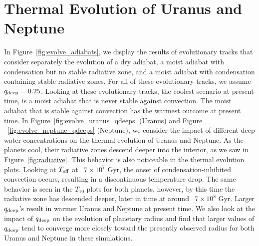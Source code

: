 \documentclass[11pt]{ucscthesisbs}
\begin{document}
\section{Thermal Evolution of Uranus and Neptune}

In Figure~\ref{fig:evolve_adiabats}, we display the results of evolutionary tracks that consider separately the evolution of a dry adiabat, a moist adiabat with condensation but no stable radiative zone, and a moist adiabat with condensation containing stable radiative zones. For all of these evolutionary tracks, we assume $q_{\rm deep} = 0.25$. Looking at these evolutionary tracks, the coolest scenario at present time, is a moist adiabat that is never stable against convection. The moist adiabat that is stable against convection has the warmest outcome at present time. In Figure~\ref{fig:evolve_uranus_qdeeps} (Uranus) and Figure ~\ref{fig:evolve_neptune_qdeeps} (Neptune), we consider the impact of different deep water concentrations on the thermal evolution of Uranus and Neptune. As the planets cool, their radiative zones descend deeper into the interior, as we saw in Figure~\ref{fig:radiative}. This behavior is also noticeable in the thermal evolution plots. Looking at $T_{\rm eff}$ at ~$7 \times 10^7$ Gyr, the onset of condensation-inhibited convection occurs, resulting in a discontinuous temperature drop. The same behavior is seen in the $T_{10}$ plots for both planets, however, by this time the radiative zone has descended deeper, later in time at around ~$7 \times 10^8$ Gyr. Larger $q_{\rm deep}$'s result in warmer Uranus and Neptune at present time. We also look at the impact of $q_{\rm deep}$ on the evolution of planetary radius and find that larger values of $q_{\rm deep}$ tend to converge more closely toward the presently observed radius for both Uranus and Neptune in these simulations. 
\end{document}
